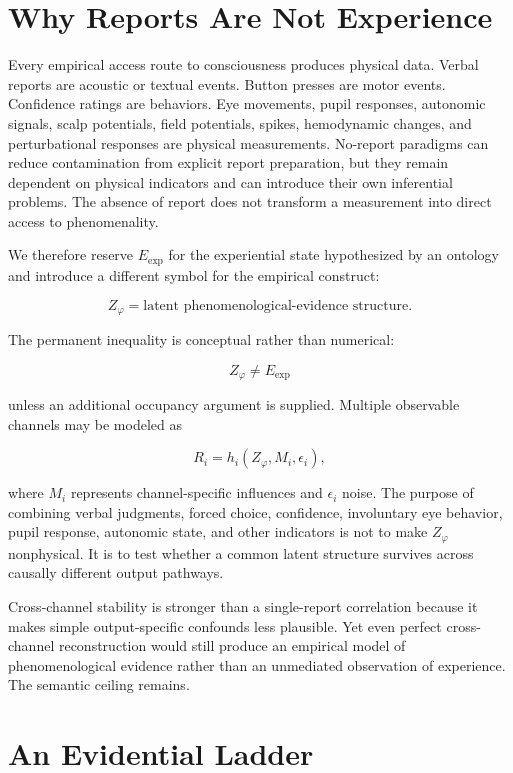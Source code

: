 \section{Why Reports Are Not Experience}

Every empirical access route to consciousness produces physical data. Verbal reports are acoustic or textual events. Button presses are motor events. Confidence ratings are behaviors. Eye movements, pupil responses, autonomic signals, scalp potentials, field potentials, spikes, hemodynamic changes, and perturbational responses are physical measurements. No-report paradigms can reduce contamination from explicit report preparation, but they remain dependent on physical indicators and can introduce their own inferential problems. The absence of report does not transform a measurement into direct access to phenomenality.

We therefore reserve $E_{\mathrm{exp}}$ for the experiential state hypothesized by an ontology and introduce a different symbol for the empirical construct:

\[
Z_\varphi=\text{latent phenomenological-evidence structure}.
\]

The permanent inequality is conceptual rather than numerical:

\[
Z_\varphi\neq E_{\mathrm{exp}}
\]

unless an additional occupancy argument is supplied. Multiple observable channels may be modeled as

\[
R_i=h_i(Z_\varphi,M_i,\epsilon_i),
\]

where $M_i$ represents channel-specific influences and $\epsilon_i$ noise. The purpose of combining verbal judgments, forced choice, confidence, involuntary eye behavior, pupil response, autonomic state, and other indicators is not to make $Z_\varphi$ nonphysical. It is to test whether a common latent structure survives across causally different output pathways.

Cross-channel stability is stronger than a single-report correlation because it makes simple output-specific confounds less plausible. Yet even perfect cross-channel reconstruction would still produce an empirical model of phenomenological evidence rather than an unmediated observation of experience. The semantic ceiling remains.

\section{An Evidential Ladder}

